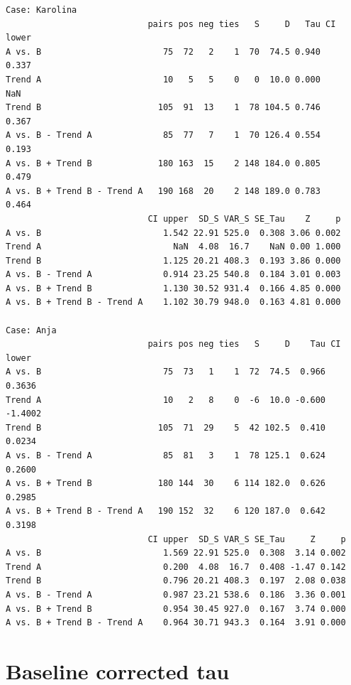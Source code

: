 \documentclass[
]{book}
\begin{document}
\begin{verbatim}
Case: Karolina 
                            pairs pos neg ties   S     D   Tau CI lower
A vs. B                        75  72   2    1  70  74.5 0.940    0.337
Trend A                        10   5   5    0   0  10.0 0.000      NaN
Trend B                       105  91  13    1  78 104.5 0.746    0.367
A vs. B - Trend A              85  77   7    1  70 126.4 0.554    0.193
A vs. B + Trend B             180 163  15    2 148 184.0 0.805    0.479
A vs. B + Trend B - Trend A   190 168  20    2 148 189.0 0.783    0.464
                            CI upper  SD_S VAR_S SE_Tau    Z     p
A vs. B                        1.542 22.91 525.0  0.308 3.06 0.002
Trend A                          NaN  4.08  16.7    NaN 0.00 1.000
Trend B                        1.125 20.21 408.3  0.193 3.86 0.000
A vs. B - Trend A              0.914 23.25 540.8  0.184 3.01 0.003
A vs. B + Trend B              1.130 30.52 931.4  0.166 4.85 0.000
A vs. B + Trend B - Trend A    1.102 30.79 948.0  0.163 4.81 0.000

Case: Anja 
                            pairs pos neg ties   S     D    Tau CI lower
A vs. B                        75  73   1    1  72  74.5  0.966   0.3636
Trend A                        10   2   8    0  -6  10.0 -0.600  -1.4002
Trend B                       105  71  29    5  42 102.5  0.410   0.0234
A vs. B - Trend A              85  81   3    1  78 125.1  0.624   0.2600
A vs. B + Trend B             180 144  30    6 114 182.0  0.626   0.2985
A vs. B + Trend B - Trend A   190 152  32    6 120 187.0  0.642   0.3198
                            CI upper  SD_S VAR_S SE_Tau     Z     p
A vs. B                        1.569 22.91 525.0  0.308  3.14 0.002
Trend A                        0.200  4.08  16.7  0.408 -1.47 0.142
Trend B                        0.796 20.21 408.3  0.197  2.08 0.038
A vs. B - Trend A              0.987 23.21 538.6  0.186  3.36 0.001
A vs. B + Trend B              0.954 30.45 927.0  0.167  3.74 0.000
A vs. B + Trend B - Trend A    0.964 30.71 943.3  0.164  3.91 0.000
\end{verbatim}

\hypertarget{baseline-corrected-tau}{%
\section{Baseline corrected tau}\label{baseline-corrected-tau}}
\end{document}
